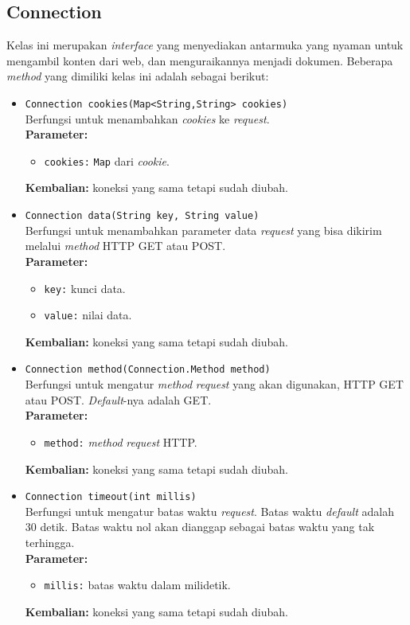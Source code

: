 \subsection{Connection}
Kelas ini merupakan \textit{interface} yang menyediakan antarmuka yang nyaman untuk mengambil konten dari web, dan menguraikannya menjadi dokumen. Beberapa \textit{method} yang dimiliki kelas ini adalah sebagai berikut:

\begin{itemize}
	\item \texttt{Connection cookies(Map<String,String> cookies)} \\
		Berfungsi untuk menambahkan \textit{cookies} ke \textit{request}. \\
		\textbf{Parameter:}
		\begin{itemize}
			\item \texttt{cookies:} \texttt{Map} dari \textit{cookie}.
		\end{itemize}
		\textbf{Kembalian:} koneksi yang sama tetapi sudah diubah.
		
		\item \texttt{Connection data(String key, String value)} \\
		Berfungsi untuk menambahkan parameter data \textit{request} yang bisa dikirim melalui \textit{method} HTTP GET atau POST. \\
		\textbf{Parameter:}
		\begin{itemize}
			\item \texttt{key:} kunci data.
			\item \texttt{value:} nilai data.
		\end{itemize}
		\textbf{Kembalian:} koneksi yang sama tetapi sudah diubah.
		
		\item \texttt{Connection method(Connection.Method method)} \\
		Berfungsi untuk mengatur \textit{method} \textit{request} yang akan digunakan, HTTP GET atau POST. \textit{Default}-nya adalah GET.\\
		\textbf{Parameter:}
		\begin{itemize}
			\item \texttt{method:} \textit{method} \textit{request} HTTP.
		\end{itemize}
		\textbf{Kembalian:} koneksi yang sama tetapi sudah diubah.
		
		\item \texttt{Connection timeout(int millis)} \\
		Berfungsi untuk mengatur batas waktu \textit{request}. Batas waktu \textit{default} adalah 30 detik. Batas waktu nol akan dianggap sebagai batas waktu yang tak terhingga. \\
		\textbf{Parameter:}
		\begin{itemize}
			\item \texttt{millis:} batas waktu dalam milidetik.
		\end{itemize}
		\textbf{Kembalian:} koneksi yang sama tetapi sudah diubah.
		

\end{itemize}
